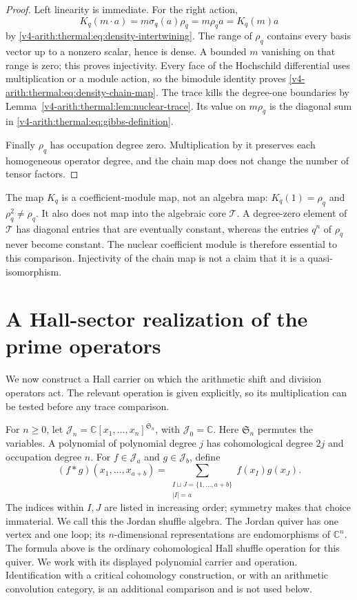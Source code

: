 \begin{proof}
Left linearity is immediate. For the right action,
\[
 K_q(m\cdot a)=m\sigma_q(a)\rho_q
              =m\rho_qa=K_q(m)a
\]
by \eqref{v4-arith:thermal:eq:density-intertwining}. The range of $\rho_q$ contains
every basis vector up to a nonzero scalar, hence is dense. A
bounded $m$ vanishing on that range is zero; this proves injectivity.
Every face of the Hochschild differential uses multiplication or
a module action, so the bimodule identity proves
\eqref{v4-arith:thermal:eq:density-chain-map}. The trace kills the degree-one
boundaries by Lemma~\ref{v4-arith:thermal:lem:nuclear-trace}. Its value on $m\rho_q$
is the diagonal sum in \eqref{v4-arith:thermal:eq:gibbs-definition}.

Finally $\rho_q$ has occupation degree zero. Multiplication by it
preserves each homogeneous operator degree, and the chain map
does not change the number of tensor factors.
\end{proof}

The map $K_q$ is a coefficient-module map, not an algebra map:
$K_q(1)=\rho_q$ and $\rho_q^2\ne\rho_q$. It also does not map into
the algebraic core $\mathcal T$. A degree-zero element of
$\mathcal T$ has diagonal entries that are eventually constant,
whereas the entries $q^n$ of $\rho_q$ never become constant.
The nuclear coefficient module is therefore essential to this
comparison. Injectivity of the chain map is not a claim that it
is a quasi-isomorphism.

\section{A Hall-sector realization of the prime operators}

We now construct a Hall carrier on which the arithmetic shift and
division operators act. The relevant operation is given explicitly,
so its multiplication can be tested before any trace comparison.

For $n\geq0$, let
$\mathcal J_n=\mathbb C[x_1,\ldots,x_n]^{\mathfrak S_n}$, with
$\mathcal J_0=\mathbb C$. Here $\mathfrak S_n$ permutes the variables.
A polynomial of polynomial degree $j$ has cohomological degree
$2j$ and occupation degree $n$. For $f\in\mathcal J_a$ and
$g\in\mathcal J_b$, define
\begin{equation}
 (f*g)(x_1,\ldots,x_{a+b})
  =\sum_{\substack{I\sqcup J=\{1,\ldots,a+b\}\\|I|=a}}
     f(x_I)g(x_J).
 \label{v4-arith:thermal:eq:jordan-shuffle}
\end{equation}
The indices within $I,J$ are listed in increasing order; symmetry
makes that choice immaterial. We call this the Jordan shuffle
algebra. The Jordan quiver has one vertex and one loop; its
$n$-dimensional representations are endomorphisms of $\mathbb C^n$.
The formula above is the ordinary cohomological Hall shuffle
operation for this quiver. We work with its displayed polynomial
carrier and operation. Identification with a critical cohomology
construction, or with an arithmetic convolution category, is an
additional comparison and is not used below.

